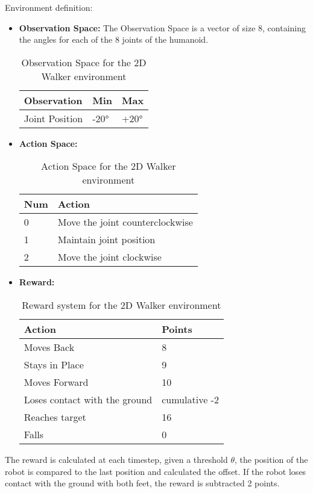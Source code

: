 Environment definition:
\begin{itemize}
 \item \textbf{Observation Space:} The Observation Space is a vector of size 8, containing the angles for each of the 8 joints of the humanoid.
 \begin{table}[H]
 \caption{Observation Space for the 2D Walker environment}
 \centering
 \begin{tabular}{|l|l|l|}
 \hline
 Observation & Min & Max \\ \hline
 Joint Position & -20° & +20° \\ \hline

 \end{tabular}
 \end{table}

 \item \textbf{Action Space:} 
 \begin{table}[H]
 \caption{Action Space for the 2D Walker environment}
 \centering
 \begin{tabular}{|l|l|}
 \hline
 Num & Action \\ \hline
 0 & Move the joint counterclockwise \\ \hline
 1 & Maintain joint position \\ \hline
 2 & Move the joint clockwise \\ \hline
 \end{tabular}
 \end{table}
 \item \textbf{Reward:} 
 \begin{table}[H]
 \caption{Reward system for the 2D Walker environment}
 \centering
 \begin{tabular}{|l|l|}
 \hline
 Action & Points \\ \hline
 Moves Back & 8 \\ \hline
 Stays in Place & 9 \\ \hline
 Moves Forward & 10 \\ \hline
 Loses contact with the ground & cumulative -2 \\ \hline
 Reaches target & 16 \\ \hline
 Falls & 0 \\ \hline
 \end{tabular}
 \end{table}
 
\end{itemize}
The reward is calculated at each timestep, given a threshold $\theta$, the position of the robot is compared to the last position and calculated the offset. If the robot loses contact with the ground with both feet, the reward is subtracted 2 points.
